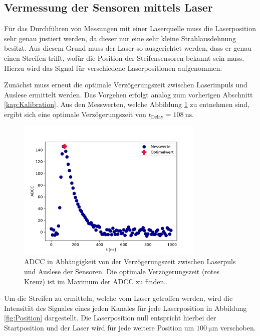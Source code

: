 \subsection{Vermessung der Sensoren mittels Laser}
\label{kap:Vermessung}
Für das Durchführen von Messungen mit einer Laserquelle muss die Laserposition sehr genau justiert werden, da dieser nur eine sehr kleine Strahlausdehnung besitzt. Aus diesem Grund muss der Laser so ausgerichtet werden, dass er genau einen Streifen trifft, wofür die Position der Steifensensoren bekannt sein muss. Hierzu wird das Signal für verschiedene Laserpositionen aufgenommen.

Zunächst muss erneut die optimale Verzögerungszeit zwischen Laserimpuls und Auslese ermittelt werden. Das Vorgehen erfolgt analog zum vorherigen Abschnitt \ref{kap:Kalibration}. Aus den Messwerten, welche Abbildung \ref{fig:Delay Laser} zu entnehmen sind, ergibt sich eine optimale Verzögerungszeit von $t_{\mathrm{Delay}}=\SI{108}{\nano\second}$.
\begin{figure}
  \centering
  \includegraphics[width=0.8\textwidth]{plots/Delay_Laser.pdf}
  \caption{ADCC in Abhängigkeit von der Verzögerungszeit zwischen Laserpuls und Auslese der Sensoren. Die optimale Verzögerungszeit (rotes Kreuz) ist im Maximum der ADCC zu finden..}
  \label{fig:Delay Laser}
\end{figure}
\FloatBarrier
Um die Streifen zu ermitteln, welche vom Laser getroffen werden, wird die Intensität des Signales eines jeden Kanales für jede Laserposition in Abbildung \ref{fig:Position} dargestellt. Die Laserposition null entspricht hierbei der Startposition und der Laser wird für jede weitere Position um $\SI{100}{\micro\meter}$ verschoben.
